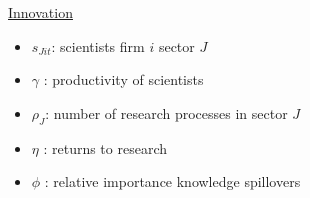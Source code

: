 \documentclass[11pt,aspectratio=169]{beamer}
\begin{document}
\begin{frame}{\hyperlink{modma}{Innovation}}
\begin{minipage}[t!]{0.43\textwidth}
\begin{itemize}
		\vspace{-2mm}		
		\item[] $s_{Jit}$: scientists firm $i$ sector $J$
		\vspace{-2mm}
		\item[] $\gamma$ : productivity of scientists
	\end{itemize}
\end{minipage}
\vspace{-5mm}
\begin{minipage}[t!]{0.55\textwidth}
	\vspace{0mm}
	\begin{itemize}	
		\item[] {$\rho_J$: number of research processes in sector $J$}
		\vspace{-2mm}			
		\item[] $\eta$ : returns to research
		\vspace{-2mm}			
		\item[] $\phi$ : relative importance knowledge spillovers
	\end{itemize}
\end{minipage}
\end{frame}
\end{document}

